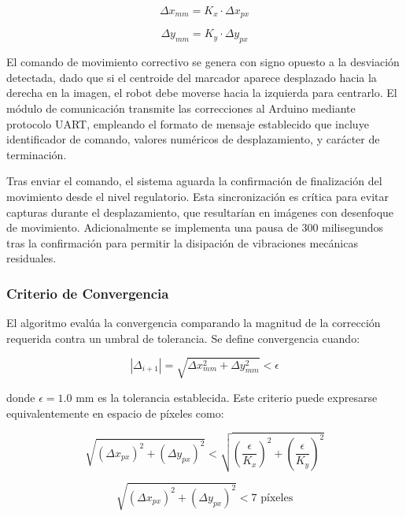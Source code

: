 \begin{equation}
\Delta x_{mm} = K_x \cdot \Delta x_{px}
\end{equation}

\begin{equation}
\Delta y_{mm} = K_y \cdot \Delta y_{px}
\end{equation}

El comando de movimiento correctivo se genera con signo opuesto a la desviación detectada, dado que si el centroide del marcador aparece desplazado hacia la derecha en la imagen, el robot debe moverse hacia la izquierda para centrarlo. El módulo de comunicación transmite las correcciones al Arduino mediante protocolo UART, empleando el formato de mensaje establecido que incluye identificador de comando, valores numéricos de desplazamiento, y carácter de terminación.

Tras enviar el comando, el sistema aguarda la confirmación de finalización del movimiento desde el nivel regulatorio. Esta sincronización es crítica para evitar capturas durante el desplazamiento, que resultarían en imágenes con desenfoque de movimiento. Adicionalmente se implementa una pausa de 300 milisegundos tras la confirmación para permitir la disipación de vibraciones mecánicas residuales.

\subsubsection{Criterio de Convergencia}

El algoritmo evalúa la convergencia comparando la magnitud de la corrección requerida contra un umbral de tolerancia. Se define convergencia cuando:

\begin{equation}
|\Delta_{i+1}| = \sqrt{\Delta x_{mm}^2 + \Delta y_{mm}^2} < \epsilon
\end{equation}

donde $\epsilon = 1.0$ mm es la tolerancia establecida. Este criterio puede expresarse equivalentemente en espacio de píxeles como:

\begin{equation}
\sqrt{(\Delta x_{px})^2 + (\Delta y_{px})^2} < \sqrt{\left(\frac{\epsilon}{K_x}\right)^2 + \left(\frac{\epsilon}{K_y}\right)^2}
\end{equation}

\begin{equation}
\sqrt{(\Delta x_{px})^2 + (\Delta y_{px})^2} < 7 \text{ píxeles}
\end{equation}

